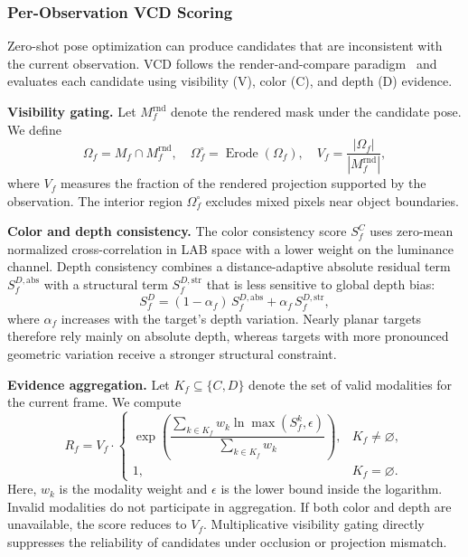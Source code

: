 \documentclass[review]{vgtc}
\begin{document}
\subsubsection{Per-Observation VCD Scoring}

Zero-shot pose optimization can produce candidates that are inconsistent with the current observation. VCD follows the render-and-compare paradigm~\cite{deepim2018,latentfusion2020,focalpose2022} and evaluates each candidate using visibility (V), color (C), and depth (D) evidence.

\textbf{Visibility gating.} Let $M_f^{\mathrm{rnd}}$ denote the rendered mask under the candidate pose. We define
\begin{equation}
\Omega_f = M_f \cap M_f^{\mathrm{rnd}}, \quad \Omega_f^{\circ} = \operatorname{Erode}(\Omega_f), \quad V_f = \frac{|\Omega_f|}{|M_f^{\mathrm{rnd}}|},
\label{eq:visibility}
\end{equation}
where $V_f$ measures the fraction of the rendered projection supported by the observation. The interior region $\Omega_f^\circ$ excludes mixed pixels near object boundaries.

\textbf{Color and depth consistency.} The color consistency score $S_f^C$ uses zero-mean normalized cross-correlation in LAB space with a lower weight on the luminance channel. Depth consistency combines a distance-adaptive absolute residual term $S_f^{D,\mathrm{abs}}$ with a structural term $S_f^{D,\mathrm{str}}$ that is less sensitive to global depth bias:
\begin{equation}
S_f^D = (1-\alpha_f)\,S_f^{D,\mathrm{abs}} + \alpha_f\,S_f^{D,\mathrm{str}},
\label{eq:depth-score}
\end{equation}
where $\alpha_f$ increases with the target's depth variation. Nearly planar targets therefore rely mainly on absolute depth, whereas targets with more pronounced geometric variation receive a stronger structural constraint.

\textbf{Evidence aggregation.} Let $K_f\subseteq\{C,D\}$ denote the set of valid modalities for the current frame. We compute
\begin{equation}
R_f = V_f \cdot
\begin{cases}
\exp\!\left(\dfrac{\sum_{k \in K_f} w_k \ln \max(S_f^{k}, \epsilon)}{\sum_{k \in K_f} w_k}\right), & K_f \neq \varnothing, \\[6pt]
1, & K_f = \varnothing.
\end{cases}
\label{eq:vcd}
\end{equation}
Here, $w_k$ is the modality weight and $\epsilon$ is the lower bound inside the logarithm. Invalid modalities do not participate in aggregation. If both color and depth are unavailable, the score reduces to $V_f$. Multiplicative visibility gating directly suppresses the reliability of candidates under occlusion or projection mismatch.
\end{document}
